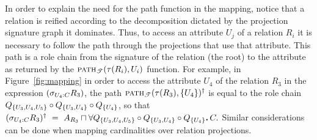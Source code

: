 \documentclass[draft]{article}
\newcommand{\per}{\mathpunct{\mbox{\bf .}}}
\newcommand{\pth}[2]{\ensuremath{\textsc{path}_{\mathscr{T}}(#1,#2)}\xspace}
\begin{document}
In order to explain the need for the path function in the mapping,
notice that a relation is reified according to the decomposition
dictated by the projection signature graph it dominates. Thus, to
access an attribute $U_j$ of a relation ${R_i}$ it is necessary to
follow the path through the projections that use that attribute. This
path is a role chain from the signature of the relation (the root) to
the attribute as returned by the $\pth{\tau(R_i)}{U_i}$ function. For
example, in Figure~\ref{fig:mapping} in order to access the
attribute $U_4$ of the relation $R_3$ in the expression
$(\sigma_{U_4 : C} R_3)$, the path $\pth{\tau(R_3)}{\{U_4\}}^\dag$ is
equal to the role chain
$Q_{\{U_3,U_4,U_5\}}\circ Q_{\{U_3,U_4\}}\circ Q_{\{U_4\}}$, so that
$ (\selects{U_4}{C}{R_3})^\dag ~=~ A_{R_3} \sqcap \forall
Q_{\{U_3,U_4,U_5\}}\chain Q_{\{U_3,U_4\}}\chain Q_{\{U_4\}}\per C.  $
Similar considerations can be done when mapping cardinalities over
relation projections.
\end{document}
